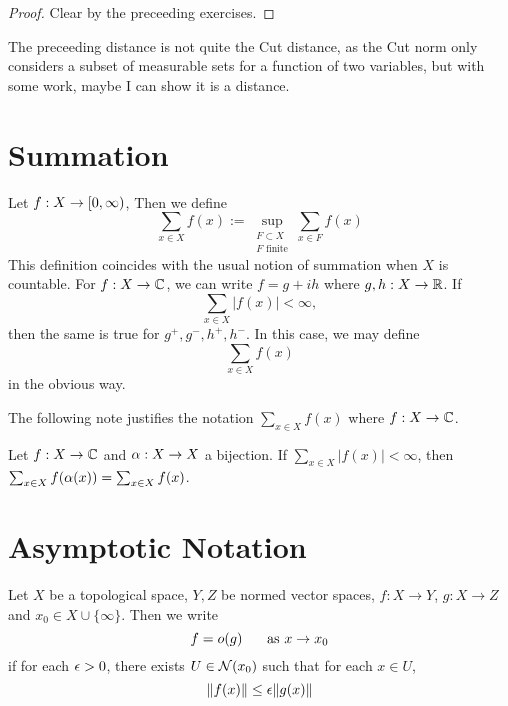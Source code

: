 \documentclass{book}
\begin{document}
	\begin{proof}
	Clear by the preceeding exercises.
	\end{proof}
	
	\begin{note}
	The preceeding distance is not quite the Cut distance, as the Cut norm only considers a subset of measurable sets for a function of two variables, but with some work, maybe I can show it is a distance.
	\end{note}
	
	
	
	
	
	
	
	
	
	
	
	
	\appendix
	
	\chapter{Summation}
	
	\begin{defn} \ld{}
		Let $f:X \rightarrow [0,\infty)$, Then we define $$\sum_{x \in X} f(x) := \sup_{\substack{F \subset X \\ F \text{ finite}}} \sum_{x \in F} f(x)$$ This definition coincides with the usual notion of summation when $X$ is countable. For $f:X \rightarrow \mathbb{C}$, we can write $f = g +ih$ where $g,h:X \rightarrow \mathbb{R}$. If $$\sum_{x \in X}|f(x)| < \infty,$$ then the same is true for $g^+,g^-,h^+,h^-$. In this case, we may define $$\sum_{x \in X} f(x)$$ in the obvious way.
	\end{defn} 
	
	The following note justifies the notation $\sum_{x \in X}f(x)$ where $f:X \rightarrow \mathbb{C}$.
	
	\begin{note}
		Let $f:X \rightarrow \mathbb{C}$ and $\alpha:X \rightarrow X$ a bijection. If $\sum_{x \in X}|f(x)|< \infty$, then $\sum_{x \in X}f( \alpha (x)) = \sum_{x \in X}f(x) $.
	\end{note}
	
	\newpage	
	
	\chapter{Asymptotic Notation}
	
	\begin{defn} \ld{}
	Let $X$ be a topological space, $Y, Z$ be normed vector spaces, $f:X \rightarrow Y$, $g: X \rightarrow Z$ and $x_0 \in X \cup \{\infty\}$. Then we write $$f = o(g) \hspace{.5cm} \text{ as } x \rightarrow x_0$$ if for each $\epsilon >0$, there exists $U \in \mathcal{N}(x_0)$ such that for each $x \in U$, $$\|f(x)\| \leq \epsilon\|g(x)\|$$
	\end{defn}
	
\end{document}
